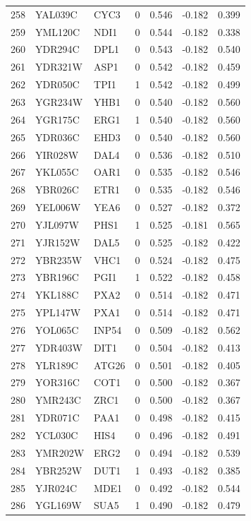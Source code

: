 \begin{longtable}{rllrrrr}
258 & YAL039C & CYC3 & 0 & 0.546 & -0.182 & 0.399\\
259 & YML120C & NDI1 & 0 & 0.544 & -0.182 & 0.338\\
260 & YDR294C & DPL1 & 0 & 0.543 & -0.182 & 0.540\\
261 & YDR321W & ASP1 & 0 & 0.542 & -0.182 & 0.459\\
262 & YDR050C & TPI1 & 1 & 0.542 & -0.182 & 0.499\\
263 & YGR234W & YHB1 & 0 & 0.540 & -0.182 & 0.560\\
264 & YGR175C & ERG1 & 1 & 0.540 & -0.182 & 0.560\\
265 & YDR036C & EHD3 & 0 & 0.540 & -0.182 & 0.560\\
266 & YIR028W & DAL4 & 0 & 0.536 & -0.182 & 0.510\\
267 & YKL055C & OAR1 & 0 & 0.535 & -0.182 & 0.546\\
268 & YBR026C & ETR1 & 0 & 0.535 & -0.182 & 0.546\\
269 & YEL006W & YEA6 & 0 & 0.527 & -0.182 & 0.372\\
270 & YJL097W & PHS1 & 1 & 0.525 & -0.181 & 0.565\\
271 & YJR152W & DAL5 & 0 & 0.525 & -0.182 & 0.422\\
272 & YBR235W & VHC1 & 0 & 0.524 & -0.182 & 0.475\\
273 & YBR196C & PGI1 & 1 & 0.522 & -0.182 & 0.458\\
274 & YKL188C & PXA2 & 0 & 0.514 & -0.182 & 0.471\\
275 & YPL147W & PXA1 & 0 & 0.514 & -0.182 & 0.471\\
276 & YOL065C & INP54 & 0 & 0.509 & -0.182 & 0.562\\
277 & YDR403W & DIT1 & 0 & 0.504 & -0.182 & 0.413\\
278 & YLR189C & ATG26 & 0 & 0.501 & -0.182 & 0.405\\
279 & YOR316C & COT1 & 0 & 0.500 & -0.182 & 0.367\\
280 & YMR243C & ZRC1 & 0 & 0.500 & -0.182 & 0.367\\
281 & YDR071C & PAA1 & 0 & 0.498 & -0.182 & 0.415\\
282 & YCL030C & HIS4 & 0 & 0.496 & -0.182 & 0.491\\
283 & YMR202W & ERG2 & 0 & 0.494 & -0.182 & 0.539\\
284 & YBR252W & DUT1 & 1 & 0.493 & -0.182 & 0.385\\
285 & YJR024C & MDE1 & 0 & 0.492 & -0.182 & 0.544\\
286 & YGL169W & SUA5 & 1 & 0.490 & -0.182 & 0.479\\

\end{longtable}
